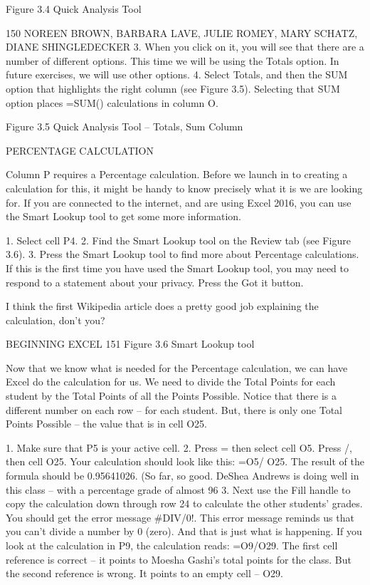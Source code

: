 Figure 3.4 Quick Analysis Tool




150 NOREEN BROWN, BARBARA LAVE, JULIE ROMEY, MARY SCHATZ, DIANE SHINGLEDECKER
3. When you click on it, you will see that there are a number of different options. This time we will
be using the Totals option. In future exercises, we will use other options.
4. Select Totals, and then the SUM option that highlights the right column (see Figure 3.5).
Selecting that SUM option places =SUM() calculations in column O.




Figure 3.5 Quick Analysis Tool – Totals, Sum Column


PERCENTAGE CALCULATION

Column P requires a Percentage calculation. Before we launch in to creating a calculation for this, it
might be handy to know precisely what it is we are looking for. If you are connected to the internet,
and are using Excel 2016, you can use the Smart Lookup tool to get some more information.

1. Select cell P4.
2. Find the Smart Lookup tool on the Review tab (see Figure 3.6).
3. Press the Smart Lookup tool to find more about Percentage calculations.
If this is the first time you have used the Smart Lookup tool, you may need to respond to a
statement about your privacy. Press the Got it button.

I think the first Wikipedia article does a pretty good job explaining the calculation, don’t you?




BEGINNING EXCEL 151
Figure 3.6 Smart Lookup tool


Now that we know what is needed for the Percentage calculation, we can have Excel do the calculation
for us. We need to divide the Total Points for each student by the Total Points of all the Points
Possible. Notice that there is a different number on each row – for each student. But, there is only
one Total Points Possible – the value that is in cell O25.

1. Make sure that P5 is your active cell.
2. Press = then select cell O5. Press /, then cell O25. Your calculation should look like this: =O5/
O25. The result of the formula should be 0.95641026. (So far, so good. DeShea Andrews is doing
well in this class – with a percentage grade of almost 96%
3. Next use the Fill handle to copy the calculation down through row 24 to calculate the other
students’ grades. You should get the error message #DIV/0!. This error message reminds us that
you can’t divide a number by 0 (zero). And that is just what is happening. If you look at the
calculation in P9, the calculation reads: =O9/O29. The first cell reference is correct – it points
to Moesha Gashi’s total points for the class. But the second reference is wrong. It points to an
empty cell – O29.

